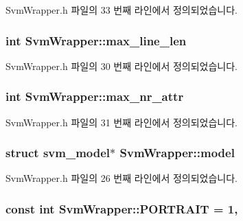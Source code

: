 Svm\+Wrapper.\+h 파일의 33 번째 라인에서 정의되었습니다.

\hypertarget{class_svm_wrapper_a6921acb6aa7fdaf8a784c4e9df839ad1}{
\subsubsection[{max\+\_\+line\+\_\+len}]{\setlength{\rightskip}{0pt plus 5cm}int Svm\+Wrapper\+::max\+\_\+line\+\_\+len\hspace{0.3cm}{\ttfamily [private]}}}\label{class_svm_wrapper_a6921acb6aa7fdaf8a784c4e9df839ad1}


Svm\+Wrapper.\+h 파일의 30 번째 라인에서 정의되었습니다.

\hypertarget{class_svm_wrapper_ac3f77511deba1c80caa8e7150097d8d6}{
\subsubsection[{max\+\_\+nr\+\_\+attr}]{\setlength{\rightskip}{0pt plus 5cm}int Svm\+Wrapper\+::max\+\_\+nr\+\_\+attr\hspace{0.3cm}{\ttfamily [private]}}}\label{class_svm_wrapper_ac3f77511deba1c80caa8e7150097d8d6}


Svm\+Wrapper.\+h 파일의 31 번째 라인에서 정의되었습니다.

\hypertarget{class_svm_wrapper_a2acad681f29bd8269c5b11aa568222ec}{
\subsubsection[{model}]{\setlength{\rightskip}{0pt plus 5cm}struct {\bf svm\+\_\+model}$\ast$ Svm\+Wrapper\+::model\hspace{0.3cm}{\ttfamily [private]}}}\label{class_svm_wrapper_a2acad681f29bd8269c5b11aa568222ec}


Svm\+Wrapper.\+h 파일의 26 번째 라인에서 정의되었습니다.

\hypertarget{class_svm_wrapper_a15817ef9250668698357b03178838c63}{
\subsubsection[{P\+O\+R\+T\+R\+A\+I\+T}]{\setlength{\rightskip}{0pt plus 5cm}const int Svm\+Wrapper\+::\+P\+O\+R\+T\+R\+A\+I\+T = 1\hspace{0.3cm}{\ttfamily [static]}, {\ttfamily [private]}}}\label{class_svm_wrapper_a15817ef9250668698357b03178838c63}


